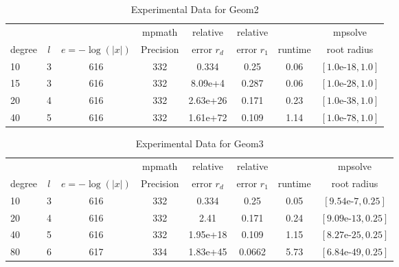 \documentclass[sigconf]{acmart}
\begin{document}
\begin{table}[t]
\caption{Experimental Data for Geom2}
\label{tab:geom2}
\vskip -0.15in
\begin{center}
\begin{small}
\begin{sc}
\begin{tabular}{lccccccc}
\toprule
&  &  & mpmath & relative  & relative &  & mpsolve \\
degree  & $l$& $e=-\log(|x|)$& Precision &error $r_d$       & error $r_1$ &runtime& root radius\\
\midrule
 10 & 3 & 616 & 332 & 0.334 & 0.25 & 0.06 & $[1.0\text{e-}18, 1.0]$\\
 15 & 3 & 616 & 332 & 8.09e+4 & 0.287 & 0.06 & $[1.0\text{e-}28, 1.0]$\\
 20 & 4 & 616 & 332 & 2.63e+26 & 0.171 & 0.23 & $[1.0\text{e-}38, 1.0]$\\
 40 & 5 & 616 & 332 & 1.61e+72 & 0.109 & 1.14 & $[1.0\text{e-}78, 1.0]$\\
\bottomrule
\end{tabular}
\end{sc}
\end{small}
\end{center}
\vskip 0.05in
\end{table}

\begin{table}[t]
\caption{Experimental Data for Geom3}
\label{tab:geom3}
\vskip -0.15in
\begin{center}
\begin{small}
\begin{sc}
\begin{tabular}{lccccccc}
\toprule
&  &  & mpmath & relative  & relative &  & mpsolve \\
degree  & $l$& $e=-\log(|x|)$& Precision &error $r_d$       & error $r_1$ &runtime& root radius\\
\midrule
 10 & 3 & 616 & 332 & 0.334 & 0.25 & 0.05 & $[9.54\text{e-}7, 0.25]$\\
 20 & 4 & 616 & 332 & 2.41 & 0.171 & 0.24 & $[9.09\text{e-}13, 0.25]$\\
 40 & 5 & 616 & 332 & 1.95e+18 & 0.109 & 1.15 & $[8.27\text{e-}25, 0.25]$\\
 80 & 6 & 617 & 334 & 1.83e+45 & 0.0662 & 5.73 & $[6.84\text{e-}49, 0.25]$\\
\bottomrule
\end{tabular}
\end{sc}
\end{small}
\end{center}
\vskip 0.05in
\end{table}
\end{document}
